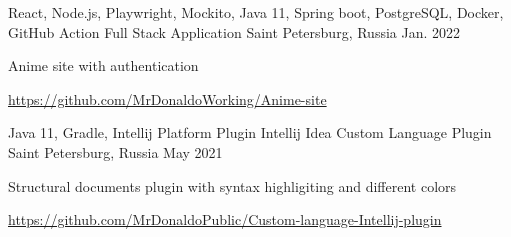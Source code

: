 \begin{cventries}
  \cventry
    {React, Node.js, Playwright, Mockito, Java 11, Spring boot, PostgreSQL, Docker, GitHub Action}%
    {Full Stack Application} %
    {Saint Petersburg, Russia} %
    {Jan. 2022} %
    {
      \begin{cvitems} %
        \item {Anime site with authentication}
        \item {\url{https://github.com/MrDonaldoWorking/Anime-site}}
      \end{cvitems}
    }

  \cventry
    {Java 11, Gradle, Intellij Platform Plugin}%
    {Intellij Idea Custom Language Plugin} %
    {Saint Petersburg, Russia} %
    {May 2021} %
    {
      \begin{cvitems} %
        \item {Structural documents plugin with syntax highligiting and different colors}
        \item {\url{https://github.com/MrDonaldoPublic/Custom-language-Intellij-plugin}}
      \end{cvitems}
    }


    
\end{cventries}
